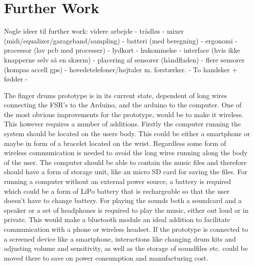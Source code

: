 \chapter{Further Work}
\label{further_work}
Nogle ideer til further work:
videre arbejde - trådløs - mixer (midi/equalizer/garageband/sampling) - batteri (med beregning) - ergonomi -  processor (lav pcb med processer) - lydkort - hukommelse - interface (hvis ikke knapperne selv så en skærm) - placering af sensorer (håndfladen) - flere sensorer (kompas accell gps) - hovedetelefoner/højtaler m. forstærker. - To handsker + fødder -    

The finger drums prototype is in its current state, dependent of long wires connecting the FSR's to the Arduino, and the arduino to the computer. One of the most obvious improvements for the prototype, would be to make it wireless. This however requires a number of additions. Firstly the computer running the system should be located on the users body. This could be either a smartphone or maybe in form of a bracelet located on the wrist. Regardless some form of wireless communication is needed to avoid the long wires running along the body of the user. The computer should be able to contain the music files and therefore should have a form of storage unit, like an micro SD card for saving the files. For running a computer without an external power source, a battery is required which could be a form of LiPo battery that is rechargeable so that the user doesn't have to change battery. For playing the sounds both a soundcard and a speaker or a set of headphones is required to play the music, either out loud or in private. This would make a bluetooth module an ideal addition to facilitate communication with a phone or wireless headset.
If the prototype is connected to a screened device like a smartphone, interactions like changing drum kits and adjusting volume and sensitivity, as well as the storage of soundfiles etc. could be moved there to save on power consumption and manufacturing cost.
